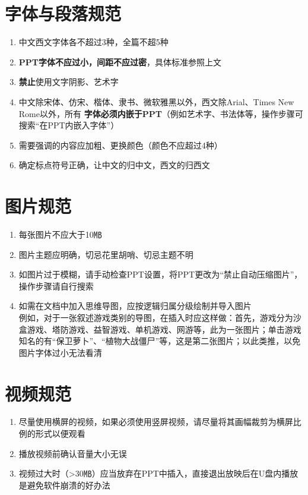 \section[字体与段落规范]{字体与段落规范}
\begin{enumerate}
    \item 中文西文字体各不超过3种，全篇不超5种
    \item \textbf{PPT字体不应过小，间距不应过密}，具体标准参照上文
    \item \textbf{禁止}使用文字阴影、艺术字
    \item 中文除宋体、仿宋、楷体、隶书、微软雅黑以外，西文除Arial、Times New Rome以外，所有 \textbf{字体必须内嵌于PPT}（例如艺术字、书法体等，操作步骤可搜索“在PPT内嵌入字体”）
    \item 需要强调的内容应加粗、更换颜色（颜色不应超过4种）
    \item 确定标点符号正确，让中文的归中文，西文的归西文
\end{enumerate}

\section[图片规范]{图片规范}
\begin{enumerate}
    \item 每张图片不应大于10㎆\footnotemark
    \item 图片主题应明确，切忌花里胡哨、切忌主题不明
    \item 如图片过于模糊，请手动检查PPT设置，将PPT更改为“禁止自动压缩图片”，操作步骤请自行搜索
    \item 如需在文档中加入思维导图，应按逻辑归属分级绘制并导入图片\\
          例如，对于一张叙述游戏类别的导图，在插入时应这样做：首先，游戏分为沙盒游戏、塔防游戏、益智游戏、单机游戏、网游等，此为一张图片；单击游戏知名的有“保卫萝卜”、“植物大战僵尸”等，这是第二张图片；以此类推，以免图片字体过小无法看清
\end{enumerate}

\section[视频规范]{视频规范}
\begin{enumerate}
    \item 尽量使用横屏的视频，如果必须使用竖屏视频，请尽量将其画幅裁剪为横屏比例的形式以便观看
    \item 播放视频前确认音量大小无误
    \item 视频过大时（>30㎆）应当放弃在PPT中插入，直接退出放映后在U盘内播放是避免软件崩溃的好办法
\end{enumerate}

